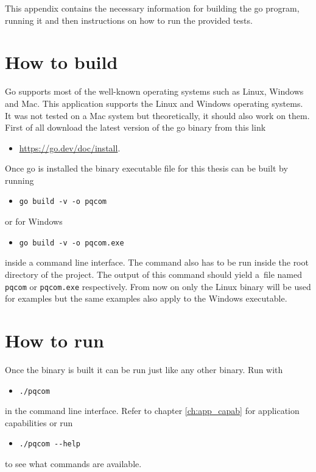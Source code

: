 This appendix contains the necessary information for building the go program, running it and then instructions on how to run the provided tests.

\section{How to build}
Go supports most of the well-known operating systems such as Linux, Windows and Mac. This application supports the Linux and Windows operating systems. It was not tested on a Mac system but theoretically, it should also work on them. First of all download the latest version of the go binary from this link
\begin{itemize}
  \item \url{https://go.dev/doc/install}.
\end{itemize}
Once go is installed the binary executable file for this thesis can be built by running
\begin{itemize}
  \item \texttt{go build -v -o pqcom}
\end{itemize}
or for Windows
\begin{itemize}
  \item \texttt{go build -v -o pqcom.exe}
\end{itemize}
inside a command line interface. The command also has to be run inside the root directory of the project. The output of this command should yield a~file named \texttt{pqcom} or \texttt{pqcom.exe} respectively. From now on only the Linux binary will be used for examples but the same examples also apply to the Windows executable.
\section{How to run}
Once the binary is built it can be run just like any other binary. Run with
\begin{itemize}
  \item \texttt{./pqcom}
\end{itemize}
in the command line interface. Refer to chapter \ref{ch:app_capab} for application capabilities or run
\begin{itemize}
  \item \texttt{./pqcom -\--help}
\end{itemize}
to see what commands are available.

